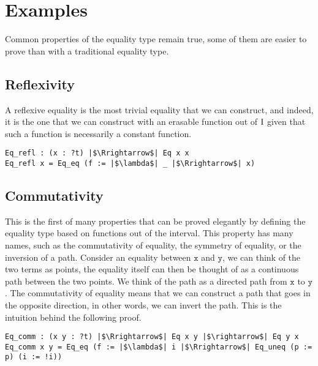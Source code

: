 \documentclass[12pt,twoside,maitrise]{dms}
\theoremstyle{definition}
\numberwithin{equation}{section}
\numberwithin{table}{chapter}
\numberwithin{figure}{chapter}
\newcommand\id[1] {\texttt{#1}}
\begin{document}
\section{Examples}\label{sec:eq-examples}
Common properties of the equality type remain true, some of them are easier to prove than with a traditional equality type.

\subsection*{Reflexivity}
A reflexive equality is the most trivial equality that we can construct, and
indeed, it is the one that we can construct with an erasable function out of
$\mathrm{I}$ given that such a function is necessarily a constant function.

\begin{verbatim}
Eq_refl : (x : ?t) |$\Rrightarrow$| Eq x x
Eq_refl x = Eq_eq (f := |$\lambda$| _ |$\Rrightarrow$| x)
\end{verbatim}

\subsection*{Commutativity}
This is the first of many properties that can be proved elegantly by defining
the equality type based on functions out of the interval. This property has many
names, such as the commutativity of equality, the symmetry of equality, or the
inversion of a path. Consider an equality between $\id{x}$ and $\id{y}$, we can
think of the two terms as points, the equality itself can then be thought of as
a continuous path between the two points. We think of the path as a directed
path from $\id{x}$ to $\id{y}$. The commutativity of equality means that we can
construct a path that goes in the opposite direction, in other words, we can
invert the path. This is the intuition behind the following proof.

\begin{verbatim}
Eq_comm : (x y : ?t) |$\Rrightarrow$| Eq x y |$\rightarrow$| Eq y x
Eq_comm x y = Eq_eq (f := |$\lambda$| i |$\Rrightarrow$| Eq_uneq (p := p) (i := !i))
\end{verbatim}
\end{document}
